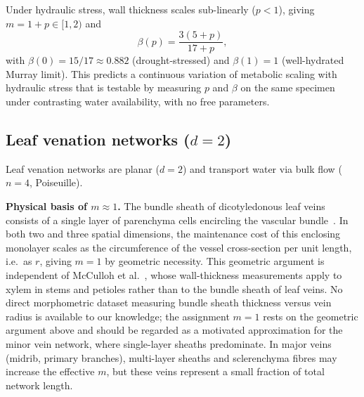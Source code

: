 \documentclass[11pt,a4paper]{article}
\theoremstyle{remark}
\begin{document}
Under hydraulic stress, wall thickness scales sub-linearly ($p < 1$), giving
$m = 1 + p \in [1, 2)$ and
\begin{equation}
\beta(p) = \frac{3(5+p)}{17+p},
\end{equation}
with $\beta(0) = 15/17 \approx 0.882$ (drought-stressed) and $\beta(1) = 1$
(well-hydrated Murray limit). This predicts a continuous variation of
metabolic scaling with hydraulic stress that is testable by measuring $p$
and $\beta$ on the same specimen under contrasting water availability,
with no free parameters.

\subsection{Leaf venation networks ($d=2$)}

Leaf venation networks are planar ($d=2$) and transport water via bulk flow
($n = 4$, Poiseuille).

\noindent\textbf{Physical basis of $m \approx 1$.} The bundle sheath of
dicotyledonous leaf veins consists of a single layer of parenchyma cells
encircling the vascular bundle~\cite{leegood2008}. In both two and three
spatial dimensions, the maintenance cost of this enclosing monolayer scales
as the circumference of the vessel cross-section per unit length, i.e.\
as $r$, giving $m = 1$ by geometric necessity. This geometric argument is
independent of McCulloh et al.~\cite{mcculloh2003}, whose wall-thickness
measurements apply to xylem in stems and petioles rather than to the
bundle sheath of leaf veins. No direct morphometric dataset measuring
bundle sheath thickness versus vein radius is available to our knowledge;
the assignment $m = 1$ rests on the geometric argument above and should
be regarded as a motivated approximation for the minor vein network, where
single-layer sheaths predominate. In major veins (midrib, primary
branches), multi-layer sheaths and sclerenchyma fibres may increase the
effective $m$, but these veins represent a small fraction of total network
length.
\end{document}
